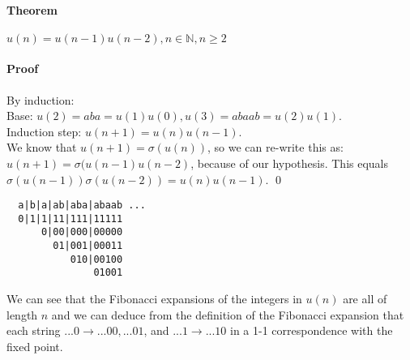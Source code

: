 \documentclass{article}
\begin{document}
\paragraph{Theorem} $u(n) = u(n - 1) u(n - 2), n \in \mathbb{N}, n \ge 2$

\paragraph{Proof} By induction:\\
Base: $u(2) = aba = u(1) u(0), u(3) = abaab = u(2) u(1)$.\\
Induction step: $u(n + 1) = u(n) u(n - 1)$.\\
We know that $u(n + 1) = \sigma(u(n))$, so we can re-write this as:
$u(n + 1) = \sigma(u(n - 1) u(n - 2)$, because of our hypothesis. This
equals $\sigma(u(n - 1)) \sigma(u(n - 2)) = u(n) u(n - 1)$. \qed
\begin{verbatim}
  a|b|a|ab|aba|abaab ...
  0|1|1|11|111|11111
      0|00|000|00000
        01|001|00011
           010|00100
               01001
\end{verbatim}
We can see that the Fibonacci expansions of the integers in $u(n)$ are all of
length $n$ and we can deduce from the definition of the Fibonacci expansion
that each string $...0 \rightarrow ...00, ...01$, and $...1 \rightarrow ...10$
in a 1-1 correspondence with the fixed point.\\
\end{document}
